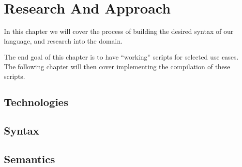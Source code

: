 \chapter{Research And Approach}\label{ch:approach}
In this chapter we will cover the process of building the desired syntax of our language, and research into the domain.

The end goal of this chapter is to have ``working'' scripts for selected use cases.
The following chapter will then cover implementing the compilation of these scripts.


\section{Technologies}



\section{Syntax}\label{sec:syntax}



\section{Semantics}\label{sec:semantics}
